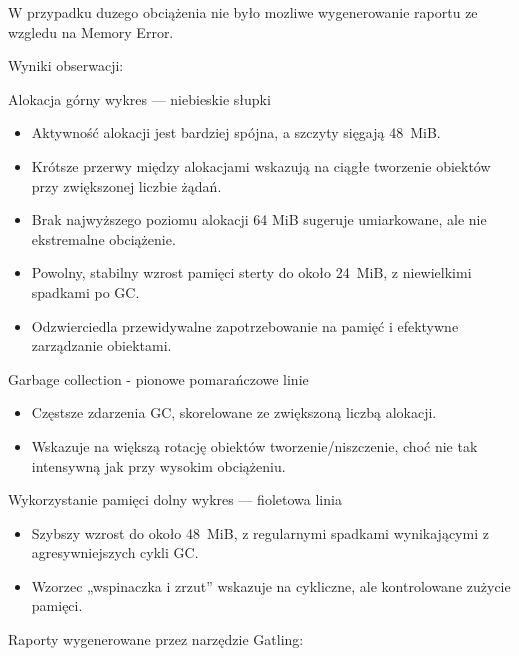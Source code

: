 \documentclass[runningheads,12pt]{llncs}
\begin{document}
W przypadku duzego obciążenia nie było mozliwe wygenerowanie raportu ze wzgledu na Memory Error.

Wyniki obserwacji:

Alokacja górny wykres — niebieskie słupki

\begin{itemize}
  \item Aktywność alokacji jest bardziej spójna, a szczyty sięgają 48~MiB.
  \item Krótsze przerwy między alokacjami wskazują na ciągłe tworzenie obiektów przy zwiększonej liczbie żądań.
  \item Brak najwyższego poziomu alokacji 64 MiB sugeruje umiarkowane, ale nie ekstremalne obciążenie.
\end{itemize}

\begin{itemize}
  \item Powolny, stabilny wzrost pamięci sterty do około 24~MiB, z niewielkimi spadkami po GC.
  \item Odzwierciedla przewidywalne zapotrzebowanie na pamięć i efektywne zarządzanie obiektami.
\end{itemize}

Garbage collection - pionowe pomarańczowe linie

\begin{itemize}
  \item Częstsze zdarzenia GC, skorelowane ze zwiększoną liczbą alokacji.
  \item Wskazuje na większą rotację obiektów tworzenie/niszczenie, choć nie tak intensywną jak przy wysokim obciążeniu.
\end{itemize}

Wykorzystanie pamięci dolny wykres — fioletowa linia

\begin{itemize}
  \item Szybszy wzrost do około 48~MiB, z regularnymi spadkami wynikającymi z agresywniejszych cykli GC.
  \item Wzorzec „wspinaczka i zrzut” wskazuje na cykliczne, ale kontrolowane zużycie pamięci.
\end{itemize}

\newpage

Raporty wygenerowane przez narzędzie Gatling:

\end{document}
